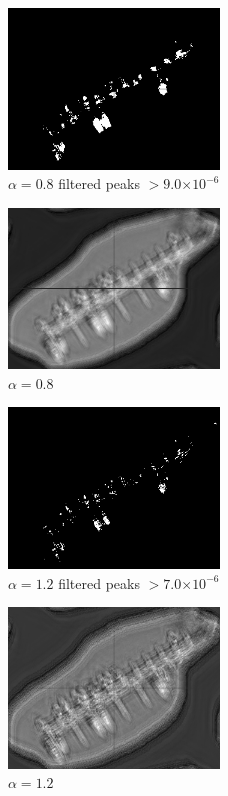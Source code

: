 \documentclass[12pt]{article}
\providecommand{\e}[1]{\ensuremath{\times 10^{#1}}}
\begin{document}
\begin{figure}
\centering
\includegraphics[width=0.50\textwidth]{boats_a08_peak9e-6.png}
\caption{\(\alpha=0.8\) filtered peaks \(> 9.0\e{-6}\)}
\label{a08peak}
\end{figure}

\begin{figure}
\centering
\includegraphics[width=0.50\textwidth]{boats_a08.png}
\caption{\(\alpha=0.8\)}
\label{a08}
\end{figure}

\begin{figure}
\centering
\includegraphics[width=0.50\textwidth]{boats_a12_peak7e-6.png}
\caption{\(\alpha=1.2\) filtered peaks \(> 7.0\e{-6}\)}
\label{a12peak}
\end{figure}

\begin{figure}
\centering
\includegraphics[width=0.50\textwidth]{boats_a12.png}
\caption{\(\alpha=1.2\)}
\label{a12}
\end{figure}
\end{document}
